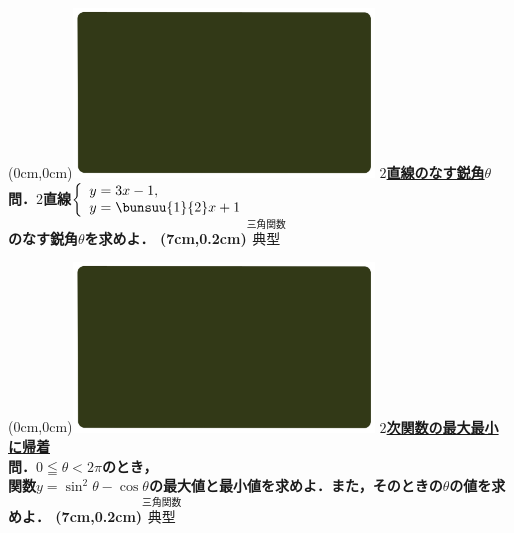 \documentclass[10pt,
fleqn,
dvipdfmx,
uplatex
]{jsarticle}
\begin{document}
\at(0cm,0cm){\includegraphics[width=8cm,bb=0 0 1920 1080]{./media_local/smart_background/三角関数.jpeg}}
{\color{orange}\bf\boldmath\LARGE\underline{$2$直線のなす鋭角$\theta$}}\vspace{0.3zw}\\
\LARGE 
\bf\boldmath 問．$2$直線$\left\{\begin{array}{l}y=3x-1,\;\\y=\bunsuu{1}{2}x+1\end{array}\right.$\\
のなす鋭角$\theta$を求めよ．
\at(7cm,0.2cm){\small\color{bradorange}$\overset{\text{三角関数}}{\text{典型}}$}


\newpage



\at(0cm,0cm){\includegraphics[width=8cm,bb=0 0 1920 1080]{./media_local/smart_background/三角関数.jpeg}}
{\color{orange}\bf\boldmath\Large\underline{$2$次関数の最大最小に帰着}}\vspace{0.3zw}\\
\Large 
\bf\boldmath 問．$0\leqq \theta <2\pi$のとき，\\関数$y=\sin ^2\theta -\cos \theta$の最大値と最小値を求めよ．また，そのときの$\theta$の値を求めよ．
\at(7cm,0.2cm){\small\color{bradorange}$\overset{\text{三角関数}}{\text{典型}}$}


\newpage
\end{document}
